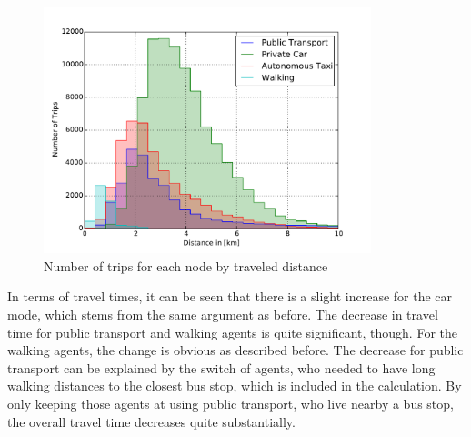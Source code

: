 \begin{figure}
    \centering
    \includegraphics[width=0.85\textwidth]{figures/modehist_av.pdf}
    \caption{Number of trips for each node by traveled distance}
    \label{fig:modehist_av}
\end{figure}

In terms of travel times, it can be seen that there is a slight increase for the car
mode, which stems from the same argument as before. The decrease in travel time for
public transport and walking agents is quite significant, though. For the walking
agents, the change is obvious as described before. The decrease for public transport
can be explained by the switch of agents, who needed to have long walking distances
to the closest bus stop, which is included in the calculation. By only keeping those
agents at using public transport, who live nearby a bus stop, the overall travel
time decreases quite substantially.

